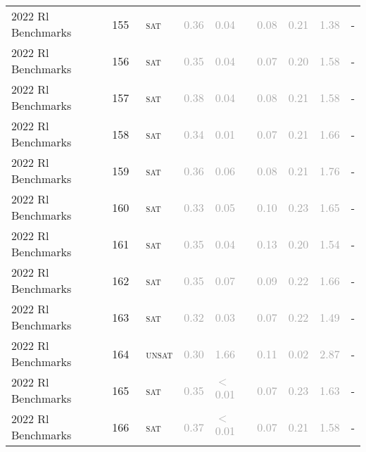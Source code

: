 \begin{center}
{\begin{longtable}{@{}lllllllll@{}}
2022 Rl Benchmarks & 155 & ~\textsc{sat} & \textcolor{darkgray}{0.36} & \textcolor{darkgray}{0.04} & \textcolor{darkgray}{0.08} & \textcolor{darkgray}{0.21} & \textcolor{darkgray}{1.38} & - \\
2022 Rl Benchmarks & 156 & ~\textsc{sat} & \textcolor{darkgray}{0.35} & \textcolor{darkgray}{0.04} & \textcolor{darkgray}{0.07} & \textcolor{darkgray}{0.20} & \textcolor{darkgray}{1.58} & - \\
2022 Rl Benchmarks & 157 & ~\textsc{sat} & \textcolor{darkgray}{0.38} & \textcolor{darkgray}{0.04} & \textcolor{darkgray}{0.08} & \textcolor{darkgray}{0.21} & \textcolor{darkgray}{1.58} & - \\
2022 Rl Benchmarks & 158 & ~\textsc{sat} & \textcolor{darkgray}{0.34} & \textcolor{darkgray}{0.01} & \textcolor{darkgray}{0.07} & \textcolor{darkgray}{0.21} & \textcolor{darkgray}{1.66} & - \\
2022 Rl Benchmarks & 159 & ~\textsc{sat} & \textcolor{darkgray}{0.36} & \textcolor{darkgray}{0.06} & \textcolor{darkgray}{0.08} & \textcolor{darkgray}{0.21} & \textcolor{darkgray}{1.76} & - \\
2022 Rl Benchmarks & 160 & ~\textsc{sat} & \textcolor{darkgray}{0.33} & \textcolor{darkgray}{0.05} & \textcolor{darkgray}{0.10} & \textcolor{darkgray}{0.23} & \textcolor{darkgray}{1.65} & - \\
2022 Rl Benchmarks & 161 & ~\textsc{sat} & \textcolor{darkgray}{0.35} & \textcolor{darkgray}{0.04} & \textcolor{darkgray}{0.13} & \textcolor{darkgray}{0.20} & \textcolor{darkgray}{1.54} & - \\
2022 Rl Benchmarks & 162 & ~\textsc{sat} & \textcolor{darkgray}{0.35} & \textcolor{darkgray}{0.07} & \textcolor{darkgray}{0.09} & \textcolor{darkgray}{0.22} & \textcolor{darkgray}{1.66} & - \\
2022 Rl Benchmarks & 163 & ~\textsc{sat} & \textcolor{darkgray}{0.32} & \textcolor{darkgray}{0.03} & \textcolor{darkgray}{0.07} & \textcolor{darkgray}{0.22} & \textcolor{darkgray}{1.49} & - \\
2022 Rl Benchmarks & 164 & ~\textsc{unsat} & \textcolor{darkgray}{0.30} & \textcolor{darkgray}{1.66} & \textcolor{darkgray}{0.11} & \textcolor{darkgray}{0.02} & \textcolor{darkgray}{2.87} & - \\
2022 Rl Benchmarks & 165 & ~\textsc{sat} & \textcolor{darkgray}{0.35} & \textcolor{darkgray}{$<$0.01} & \textcolor{darkgray}{0.07} & \textcolor{darkgray}{0.23} & \textcolor{darkgray}{1.63} & - \\
2022 Rl Benchmarks & 166 & ~\textsc{sat} & \textcolor{darkgray}{0.37} & \textcolor{darkgray}{$<$0.01} & \textcolor{darkgray}{0.07} & \textcolor{darkgray}{0.21} & \textcolor{darkgray}{1.58} & - \\

\end{longtable}}
\end{center}
